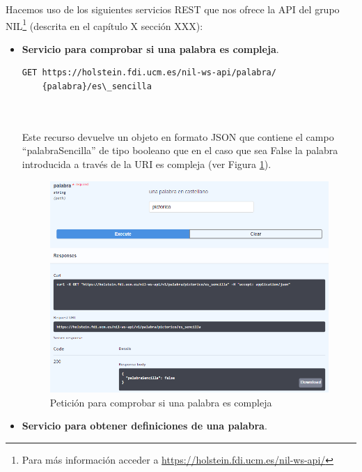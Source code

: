   Hacemos uso de los siguientes servicios REST que nos ofrece la API del grupo NIL\footnote{Para más información acceder a \href{https://holstein.fdi.ucm.es/nil-ws-api/}{https://holstein.fdi.ucm.es/nil-ws-api/}} (descrita en el capítulo X sección XXX):


	


\begin{itemize}
	\item \textbf{Servicio para comprobar si una palabra es compleja}.
	\begin{lstlisting}[backgroundcolor = \color{pink},
	xleftmargin = 1cm,
	framexleftmargin = 1em,frame=tlbr,framesep=4pt,framerule=1pt]
	GET https://holstein.fdi.ucm.es/nil-ws-api/palabra/
	{palabra}/es\_sencilla
	
	
\end{lstlisting}
	
	Este recurso devuelve un objeto en formato JSON que contiene el campo ``palabraSencilla'' de tipo booleano que en el caso que sea False la palabra introducida a través de la URI es compleja (ver Figura \ref{fig:apiSencilla}).
		 \begin{figure}[h!]
		\centering
		
		
		\includegraphics[scale=1]{Imagenes/Figuras/APISencilla}
		
		
		\caption{Petición para comprobar si una palabra es compleja}
		\label{fig:apiSencilla}
	\end{figure}
	\item \textbf{Servicio para obtener definiciones de una palabra}.
\newline


\end{itemize}
